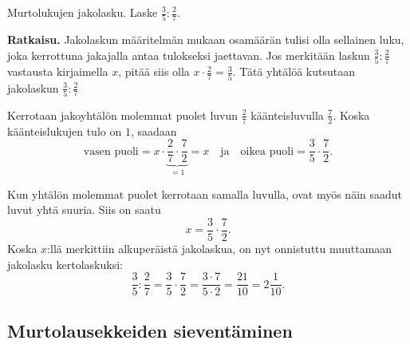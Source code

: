 \begin{esimerkki}
Murtolukujen jakolasku. Laske $\frac 3 5 : \frac 2 7$.

\textbf{Ratkaisu.}
Jakolaskun määritelmän mukaan osamäärän tulisi olla sellainen luku, joka kerrottuna jakajalla antaa tulokseksi jaettavan. 
Jos merkitään laskun $\frac 3 5 : \frac 2 7$ vastausta kirjaimella $x$, pitää siis olla $x \cdot \frac 2 7 = \frac 3 5$.  
Tätä yhtälöä kutsutaan jakolaskun $\frac 3 5 : \frac 2 7$ 

Kerrotaan jakoyhtälön molemmat puolet luvun $\frac 2 7$ käänteisluvulla $\frac 7 2$. Koska käänteislukujen tulo on $1$, saadaan
\[
	\text{vasen puoli} = x \cdot \underbrace{\frac 2 7 \cdot \frac 7 2}_{= 1} = x \quad \text{ja} \quad \text{oikea puoli} = \frac 3 5 \cdot \frac 7 2.
\]

Kun yhtälön molemmat puolet kerrotaan samalla luvulla, ovat myös näin saadut luvut yhtä suuria. Siis on saatu
\[
	x = \frac 3 5 \cdot \frac 7 2.
\]
Koska $x$:llä merkittiin alkuperäistä jakolaskua, on nyt onnistuttu muuttamaan jakolasku kertolaskuksi:
\[
	\frac 3 5 : \frac 2 7 = \frac 3 5 \cdot \frac 7 2 = \frac{3 \cdot 7}{5 \cdot 2} = \frac{21}{10} = 2 \frac{1}{10}.
\]
 \end{esimerkki}
 


    \subsection*{Murtolausekkeiden sieventäminen}


